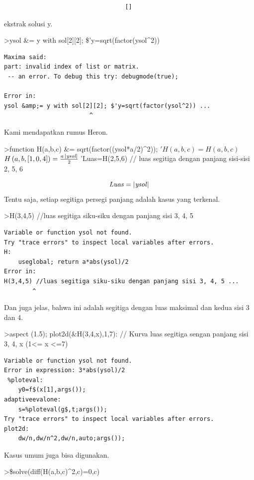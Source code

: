 \documentclass[
]{book}
\begin{document}
\begin{verbatim}
                                  []
\end{verbatim}

ekstrak solusi y.

\textgreater ysol \&= y with sol{[}2{]}{[}2{]}; \$'y=sqrt(factor(ysol\^{}2))

\begin{verbatim}
Maxima said:
part: invalid index of list or matrix.
 -- an error. To debug this try: debugmode(true);

Error in:
ysol &amp;= y with sol[2][2]; $'y=sqrt(factor(ysol^2)) ...
                        ^
\end{verbatim}

Kami mendapatkan rumus Heron.

\textgreater function H(a,b,c) \&= sqrt(factor((ysol*a/2)\^{}2)); \('H(a,b,c)=H(a,b,c)\)\(H\left(a , b , \left[ 1 , 0 , 4 \right] \right)=\frac{a\,\left|   {\it ysol}\right| }{2}\)\(\>\)'Luas=H(2,5,6) // luas segitiga dengan panjang sisi-sisi 2, 5, 6

\[{\it Luas}=\left| {\it ysol}\right|\]Tentu saja, setiap segitiga persegi panjang adalah kasus yang terkenal.

\textgreater H(3,4,5) //luas segitiga siku-siku dengan panjang sisi 3, 4, 5

\begin{verbatim}
Variable or function ysol not found.
Try "trace errors" to inspect local variables after errors.
H:
    useglobal; return a*abs(ysol)/2 
Error in:
H(3,4,5) //luas segitiga siku-siku dengan panjang sisi 3, 4, 5 ...
        ^
\end{verbatim}

Dan juga jelas, bahwa ini adalah segitiga dengan luas maksimal dan kedua sisi 3 dan 4.

\textgreater aspect (1.5); plot2d(\&H(3,4,x),1,7): // Kurva luas segitiga sengan panjang sisi 3, 4, x (1\textless= x \textless=7)

\begin{verbatim}
Variable or function ysol not found.
Error in expression: 3*abs(ysol)/2
 %ploteval:
    y0=f$(x[1],args());
adaptiveevalone:
    s=%ploteval(g$,t;args());
Try "trace errors" to inspect local variables after errors.
plot2d:
    dw/n,dw/n^2,dw/n,auto;args());
\end{verbatim}

Kasus umum juga bisa digunakan.

\textgreater\$solve(diff(H(a,b,c)\^{}2,c)=0,c)
\end{document}
